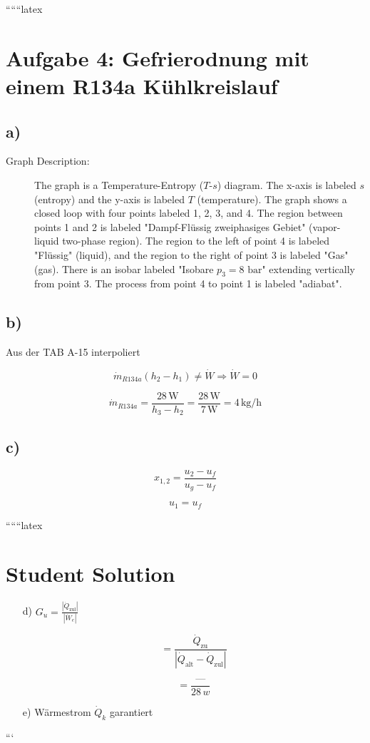 
``````latex


\section*{Aufgabe 4: Gefrierodnung mit einem R134a Kühlkreislauf}

\subsection*{a)}

\begin{description}
    \item[Graph Description:] The graph is a Temperature-Entropy ($T$-$s$) diagram. The x-axis is labeled $s$ (entropy) and the y-axis is labeled $T$ (temperature). The graph shows a closed loop with four points labeled 1, 2, 3, and 4. The region between points 1 and 2 is labeled "Dampf-Flüssig zweiphasiges Gebiet" (vapor-liquid two-phase region). The region to the left of point 4 is labeled "Flüssig" (liquid), and the region to the right of point 3 is labeled "Gas" (gas). There is an isobar labeled "Isobare $p_3 = 8 \text{ bar}$" extending vertically from point 3. The process from point 4 to point 1 is labeled "adiabat".
\end{description}

\subsection*{b)}

Aus der TAB A-15 interpoliert

\[
\dot{m}_{R134a} (h_2 - h_1) \neq \dot{W} \Rightarrow \dot{W} = 0
\]

\[
\dot{m}_{R134a} = \frac{28 \, \text{W}}{h_3 - h_2} = \frac{28 \, \text{W}}{7 \, \text{W}} = 4 \, \text{kg/h}
\]

\subsection*{c)}

\[
x_{1,2} = \frac{u_2 - u_f}{u_g - u_f}
\]

\[
u_1 = u_f
\]

``````latex


\section*{Student Solution}

\begin{itemize}
    \item[d)] \( G_{u} = \frac{\left| \dot{Q}_{\text{zul}} \right|}{\left| \dot{W}_{e} \right|} \)
    
    \[
    = \frac{\dot{Q}_{\text{zu}}}{\left| \dot{Q}_{\text{alt}} - \dot{Q}_{\text{zul}} \right|}
    \]
    
    \[
    = \frac{\text{---}}{28 \, w}
    \]
    
    \item[e)] Wärmestrom \( \dot{Q}_{k} \) garantiert
\end{itemize}

```